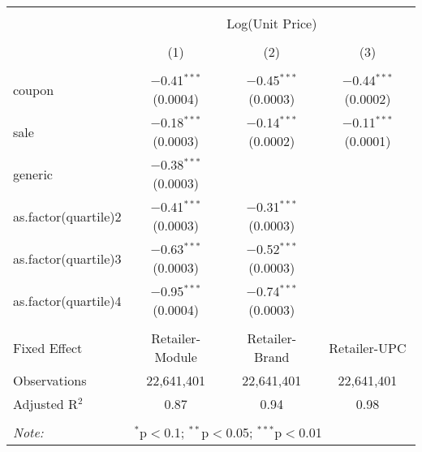 
\begin{table}[!htbp] \centering 
  \caption{} 
  \label{tab:overallSavingsStorable} 
\begin{tabular}{@{\extracolsep{5pt}}lccc} 
\\[-1.8ex]\hline 
\hline \\[-1.8ex] 
 & \multicolumn{3}{c}{Log(Unit Price)} \\ 
\\[-1.8ex] & (1) & (2) & (3)\\ 
\hline \\[-1.8ex] 
 coupon & $-$0.41$^{***}$ (0.0004) & $-$0.45$^{***}$ (0.0003) & $-$0.44$^{***}$ (0.0002) \\ 
  sale & $-$0.18$^{***}$ (0.0003) & $-$0.14$^{***}$ (0.0002) & $-$0.11$^{***}$ (0.0001) \\ 
  generic & $-$0.38$^{***}$ (0.0003) &  &  \\ 
  as.factor(quartile)2 & $-$0.41$^{***}$ (0.0003) & $-$0.31$^{***}$ (0.0003) &  \\ 
  as.factor(quartile)3 & $-$0.63$^{***}$ (0.0003) & $-$0.52$^{***}$ (0.0003) &  \\ 
  as.factor(quartile)4 & $-$0.95$^{***}$ (0.0004) & $-$0.74$^{***}$ (0.0003) &  \\ 
 \hline \\[-1.8ex] 
Fixed Effect & Retailer-Module & Retailer-Brand & Retailer-UPC \\ 
Observations & 22,641,401 & 22,641,401 & 22,641,401 \\ 
Adjusted R$^{2}$ & 0.87 & 0.94 & 0.98 \\ 
\hline 
\hline \\[-1.8ex] 
\textit{Note:}  & \multicolumn{3}{l}{$^{*}$p$<$0.1; $^{**}$p$<$0.05; $^{***}$p$<$0.01} \\ 
\end{tabular} 
\end{table} 
